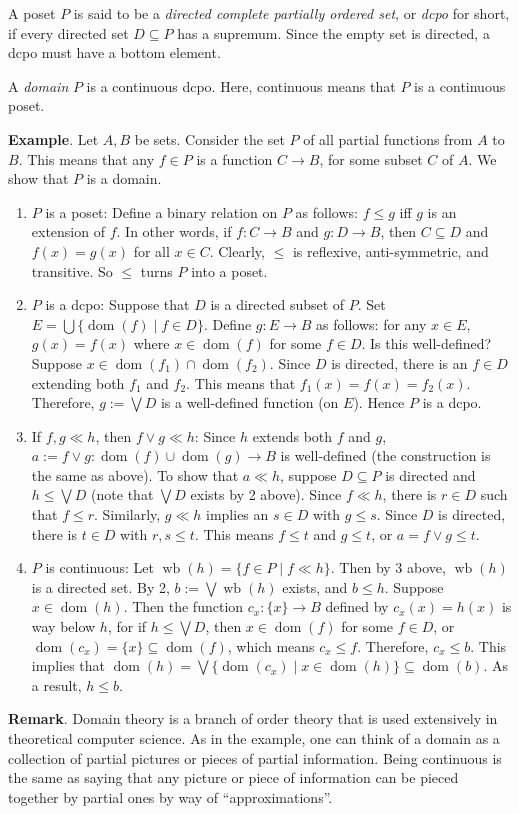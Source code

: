 \documentclass[12pt]{article}
\newcommand{\dom}{\operatorname{dom}}
\begin{document}
A poset $P$ is said to be a \emph{directed complete partially ordered set}, or \emph{dcpo} for short, if every directed set $D\subseteq P$ has a supremum.  Since the empty set is directed, a dcpo must have a bottom element.

A \emph{domain} $P$ is a continuous dcpo.  Here, continuous means that $P$ is a continuous poset.

\textbf{Example}.  Let $A,B$ be sets.  Consider the set $P$ of all partial functions from $A$ to $B$.  This means that any $f\in P$ is a function $C\to B$, for some subset $C$ of $A$.  We show that $P$ is a domain.
\begin{enumerate}
\item $P$ is a poset:  Define a binary relation on $P$ as follows: $f\le g$ iff $g$ is an extension of $f$.  In other words, if $f:C\to B$ and $g:D\to B$, then $C \subseteq D$ and $f(x)=g(x)$ for all $x\in C$.  Clearly, $\le$ is reflexive, anti-symmetric, and transitive.  So $\le$ turns $P$ into a poset.  
\item $P$ is a dcpo:  Suppose that $D$ is a directed subset of $P$.  Set $E=\bigcup \lbrace \dom(f) \mid f\in D\rbrace$.  Define $g:E\to B$ as follows: for any $x\in E$, $g(x)=f(x)$ where $x\in \dom(f)$ for some $f\in D$.  Is this well-defined?  Suppose $x\in \dom(f_1)\cap\dom(f_2)$.  Since $D$ is directed, there is an $f\in D$ extending both $f_1$ and $f_2$.  This means that $f_1(x)=f(x)=f_2(x)$.  Therefore, $g:=\bigvee D$ is a well-defined function (on $E$).  Hence $P$ is a dcpo.
\item If $f,g\ll h$, then $f\vee g\ll h$:  Since $h$ extends both $f$ and $g$, $a:=f\vee g:\dom(f)\cup\dom(g)\to B$ is well-defined (the construction is the same as above).  To show that $a\ll h$, suppose $D\subseteq P$ is directed and $h\le \bigvee D$ (note that $\bigvee D$ exists by 2 above).  Since $f\ll h$, there is $r\in D$ such that $f\le r$.  Similarly, $g\ll h$ implies an $s\in D$ with $g\le s$.  Since $D$ is directed, there is $t\in D$ with $r,s\le t$.  This means $f\le t$ and $g\le t$, or $a=f\vee g\le t$.
\item $P$ is continuous: Let $\operatorname{wb}(h)=\lbrace f \in P\mid f\ll h \rbrace$.  Then by 3 above, $\operatorname{wb}(h)$ is a directed set.  By 2, $b:=\bigvee \operatorname{wb}(h)$ exists, and $b\le h$.  Suppose $x\in \dom(h)$.  Then the function $c_x:\lbrace x\rbrace\to B$ defined by $c_x(x)=h(x)$ is way below $h$, for if $h\le \bigvee D$, then $x\in \dom(f)$ for some $f\in D$, or $\dom(c_x)=\lbrace x\rbrace \subseteq \dom(f)$, which means $c_x\le f$.  Therefore, $c_x\le b$.  This implies that $\dom(h)= \bigvee \lbrace \dom(c_x)\mid x\in \dom(h)\rbrace \subseteq \dom(b)$.  As a result, $h\le b$.
\end{enumerate}

\textbf{Remark}.  Domain theory is a branch of order theory that is used extensively in theoretical computer science.  As in the example, one can think of a domain as a collection of partial pictures or pieces of partial information.  Being continuous is the same as saying that any picture or piece of information can be pieced together by partial ones by way of ``approximations''.
\end{document}
